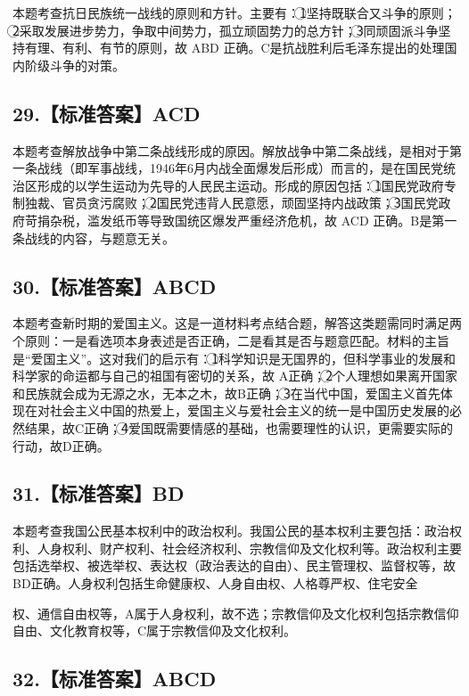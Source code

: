 \documentclass[UTF8,11pt]{ctexart}
\begin{document}
本题考查抗日民族统一战线的原则和方针。主要有：\textcircled{1}坚持既联合又斗争的原则；\textcircled{2}采取发展进步势力，争取中间势力，孤立顽固势力的总方针；\textcircled{3}同顽固派斗争坚持有理、有利、有节的原则，故 ABD 正确。C是抗战胜利后毛泽东提出的处理国内阶级斗争的对策。


\subsection*{29.【标准答案】ACD}

本题考查解放战争中第二条战线形成的原因。解放战争中第二条战线，是相对于第一条战线（即军事战线，1946年6月内战全面爆发后形成）而言的，是在国民党统治区形成的以学生运动为先导的人民民主运动。形成的原因包括：\textcircled{1}国民党政府专制独裁、官员贪污腐败；\textcircled{2}国民党违背人民意愿，顽固坚持内战政策；\textcircled{3}国民党政府苛捐杂税，滥发纸币等导致国统区爆发严重经济危机，故 ACD 正确。B是第一条战线的内容，与题意无关。


\subsection*{30.【标准答案】ABCD}

本题考查新时期的爱国主义。这是一道材料考点结合题，解答这类题需同时满足两个原则：一是看选项本身表述是否正确，二是看其是否与题意匹配。材料的主旨是“爱国主义”。这对我们的启示有：\textcircled{1}科学知识是无国界的，但科学事业的发展和科学家的命运都与自己的祖国有密切的关系，故 A正确；\textcircled{2}个人理想如果离开国家和民族就会成为无源之水，无本之木，故B正确；\textcircled{3}在当代中国，爱国主义首先体现在对社会主义中国的热爱上，爱国主义与爱社会主义的统一是中国历史发展的必然结果，故C正确；\textcircled{4}爱国既需要情感的基础，也需要理性的认识，更需要实际的行动，故D正确。


\subsection*{31.【标准答案】BD}

本题考查我国公民基本权利中的政治权利。我国公民的基本权利主要包括：政治权利、人身权利、财产权利、社会经济权利、宗教信仰及文化权利等。政治权利主要包括选举权、被选举权、表达权（政治表达的自由）、民主管理权、监督权等，故 BD正确。人身权利包括生命健康权、人身自由权、人格尊严权、住宅安全


权、通信自由权等，A属于人身权利，故不选；宗教信仰及文化权利包括宗教信仰自由、文化教育权等，C属于宗教信仰及文化权利。


\subsection*{32.【标准答案】ABCD}
\end{document}
